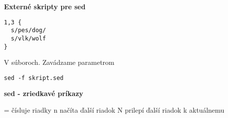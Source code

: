 \documentclass[8pt,landscape]{extarticle}
\newcommand{\Heading}[1]{%
{\begin{center}\bfseries\Large#1\end{center}}%
}%
\newcommand{\Em}[1]{\Ovalbox{\ttfamily #1}}
\newenvironment{karticka}[1]%
{%
\Heading{#1}%
}%
{%
\clearpage
}%
\begin{document}
\begin{karticka}{Externé skripty pre sed}
\begin{middlecolorbox}
\begin{Verbatim}
1,3 {
  s/pes/dog/
  s/vlk/wolf
}
\end{Verbatim}
\end{middlecolorbox}
\par\medskip
V súboroch. Zavádzame parametrom \Em{-f}
\vfill
\begin{bottomcolorbox}
\begin{Verbatim}
sed -f skript.sed
\end{Verbatim}
\end{bottomcolorbox}
\end{karticka}
\begin{karticka}{sed - zriedkavé príkazy}
\begin{obsah}
= čísluje riadky
n načíta ďalší riadok
N prilepí ďalší riadok k aktuálnemu
\end{obsah}
\end{karticka}
\end{document}
